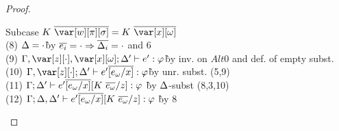 \begin{proof}
\begin{description}
\begin{tabbing}
    Subcase $K~\ov{\var[w][\pi][\s]} = K~\ov{\xo}$\\
    (8) $\Delta = \cdot$\`by $\overline{e_i}=\cdot \Rightarrow \overline{\Delta_i}=\cdot$ and 6\\
    (9) $\G, \z[\cdot], \xo; \D' \vdash e' : \vp$\`by inv. on $Alt0$ and def. of empty subst.\\
    (10) $\G, \z[\cdot]; \D' \vdash e'\ov{[e_\omega/x]} : \vp$\`by unr. subst. (5,9)\\
    (11) $\Gamma; \Delta' \vdash e'\overline{[e_\omega/x]}[K~\overline{e_\omega}/z] : \varphi$ \` by $\Delta$-subst (8,3,10)\\
    (12) $\Gamma; \Delta, \Delta' \vdash e'\overline{[e_\omega/x]}[K~\overline{e_\omega}/z] : \varphi$ \`by 8\\


\end{tabbing}
\end{description}
\end{proof}
